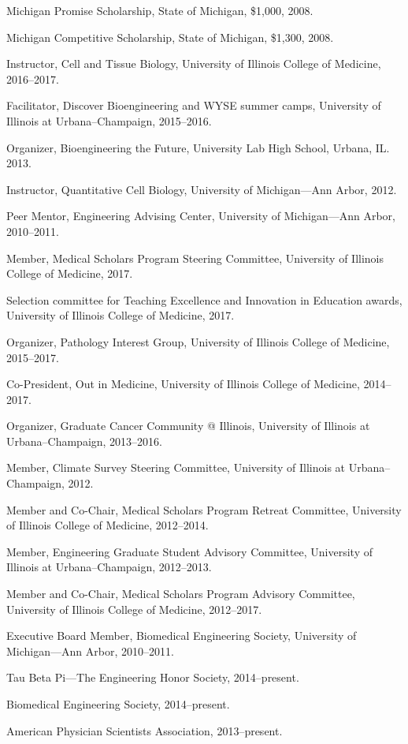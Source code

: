 \documentclass[11pt,article,oneside]{memoir}
\begin{document}
\ind Michigan Promise Scholarship, State of Michigan, \$1,000, 2008.

\ind Michigan Competitive Scholarship, State of Michigan, \$1,300, 2008.

\bigskip\bigskip


\ind Instructor, Cell and Tissue Biology, University of Illinois College of Medicine, 2016--2017.

\ind Facilitator, Discover Bioengineering and WYSE summer camps, University of Illinois at Urbana--Champaign, 2015--2016.

\ind Organizer, Bioengineering the Future, University Lab High School, Urbana, IL. 2013.

\ind Instructor, Quantitative Cell Biology, University of Michigan---Ann Arbor, 2012.

\ind Peer Mentor, Engineering Advising Center, University of Michigan---Ann Arbor, 2010--2011.

\bigskip


\ind Member, Medical Scholars Program Steering Committee, University of Illinois College of Medicine, 2017.

\ind Selection committee for Teaching Excellence and Innovation in Education awards, University of Illinois College of Medicine, 2017.

\ind Organizer, Pathology Interest Group, University of Illinois College of Medicine, 2015--2017.

\ind Co-President, Out in Medicine, University of Illinois College of Medicine, 2014--2017.

\ind Organizer, Graduate Cancer Community @ Illinois, University of Illinois at Urbana--Champaign, 2013--2016.

\ind Member, Climate Survey Steering Committee, University of Illinois at Urbana--Champaign, 2012.

\ind Member and Co-Chair, Medical Scholars Program Retreat Committee, University of Illinois College of Medicine, 2012--2014.

\ind Member, Engineering Graduate Student Advisory Committee, University of Illinois at Urbana--Champaign, 2012--2013.

\ind Member and Co-Chair, Medical Scholars Program Advisory Committee, University of Illinois College of Medicine, 2012--2017.

\ind Executive Board Member, Biomedical Engineering Society, University of Michigan---Ann Arbor, 2010--2011.

\bigskip


\ind Tau Beta Pi---The Engineering Honor Society, 2014--present.

\ind Biomedical Engineering Society, 2014--present.

\ind American Physician Scientists Association, 2013--present.
\end{document}
